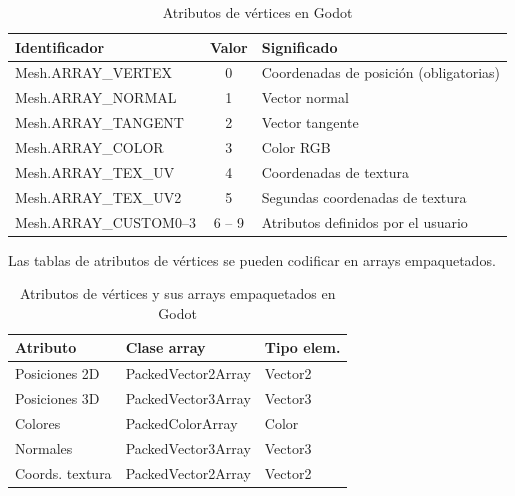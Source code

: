 \documentclass[12pt]{book} %
\begin{document}
\begin{table}[H]
\centering
\begin{tabular}{|l|c|l|}
\hline
\textbf{Identificador}         & \textbf{Valor} & \textbf{Significado}                                   \\ \hline
Mesh.ARRAY\_VERTEX             & 0              & Coordenadas de posición (obligatorias)                \\ \hline
Mesh.ARRAY\_NORMAL             & 1              & Vector normal                                         \\ \hline
Mesh.ARRAY\_TANGENT            & 2              & Vector tangente                                       \\ \hline
Mesh.ARRAY\_COLOR              & 3              & Color RGB                                            \\ \hline
Mesh.ARRAY\_TEX\_UV            & 4              & Coordenadas de textura                               \\ \hline
Mesh.ARRAY\_TEX\_UV2           & 5              & Segundas coordenadas de textura                     \\ \hline
Mesh.ARRAY\_CUSTOM0--3         & 6 -- 9         & Atributos definidos por el usuario                  \\ \hline
\end{tabular}
\caption{Atributos de vértices en Godot}
\end{table}

Las tablas de atributos de vértices se pueden codificar en arrays
empaquetados.

\begin{table}[H]
\centering
\begin{tabular}{|l|l|l|}
\hline
\textbf{Atributo}         & \textbf{Clase array}         & \textbf{Tipo elem.} \\ \hline
Posiciones 2D             & PackedVector2Array          & Vector2             \\ \hline
Posiciones 3D             & PackedVector3Array          & Vector3             \\ \hline
Colores                   & PackedColorArray            & Color               \\ \hline
Normales                  & PackedVector3Array          & Vector3             \\ \hline
Coords. textura           & PackedVector2Array          & Vector2             \\ \hline
\end{tabular}
\caption{Atributos de vértices y sus arrays empaquetados en Godot}
\end{table}
\end{document}
